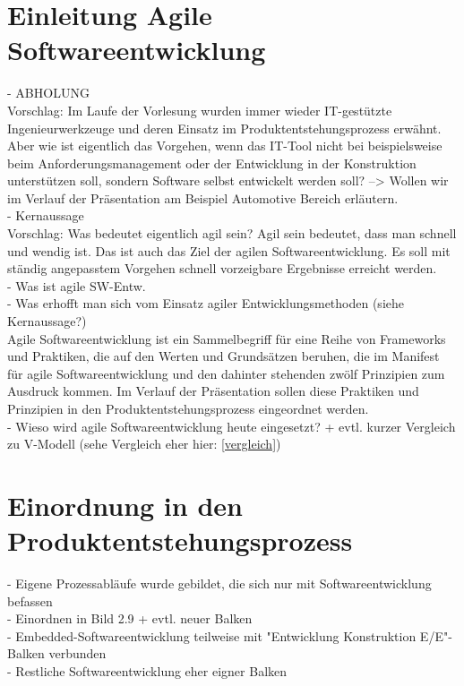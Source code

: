 \section{Einleitung Agile Softwareentwicklung}
- ABHOLUNG\\
Vorschlag: Im Laufe der Vorlesung wurden immer wieder IT-gestützte Ingenieurwerkzeuge und deren Einsatz im Produktentstehungsprozess erwähnt. \cite{Daberkow2022} Aber wie ist eigentlich das Vorgehen, wenn das IT-Tool nicht bei beispielsweise beim Anforderungsmanagement oder der Entwicklung in der Konstruktion unterstützen soll, sondern Software selbst entwickelt werden soll? --> Wollen wir im Verlauf der Präsentation am Beispiel Automotive Bereich erläutern. \\
- Kernaussage\\
Vorschlag: Was bedeutet eigentlich agil sein? Agil sein bedeutet, dass man schnell und wendig ist. Das ist auch das Ziel der agilen Softwareentwicklung. Es soll mit ständig angepasstem Vorgehen schnell vorzeigbare Ergebnisse erreicht werden. \cite{wolf2011agile}\\
- Was ist agile SW-Entw.\\
- Was erhofft man sich vom Einsatz agiler Entwicklungsmethoden (siehe Kernaussage?)\\
\glqq Agile Softwareentwicklung ist ein Sammelbegriff für eine Reihe von Frameworks und Praktiken, die auf den Werten und Grundsätzen beruhen, die im Manifest für agile Softwareentwicklung und den dahinter stehenden zwölf Prinzipien zum Ausdruck kommen.\grqq  \cite{agile101} Im Verlauf der Präsentation sollen diese Praktiken und Prinzipien in den Produktentstehungsprozess eingeordnet werden. \\
- Wieso wird agile Softwareentwicklung heute eingesetzt? + evtl. kurzer Vergleich zu V-Modell (sehe Vergleich eher hier: \ref{vergleich})\\ 

\section{Einordnung in den Produktentstehungsprozess}
- Eigene Prozessabläufe wurde gebildet, die sich nur mit Softwareentwicklung befassen\\
- Einordnen in Bild 2.9 + evtl. neuer Balken\\
- Embedded-Softwareentwicklung teilweise mit "Entwicklung Konstruktion E/E"-Balken verbunden\\
- Restliche Softwareentwicklung eher eigner Balken\\

